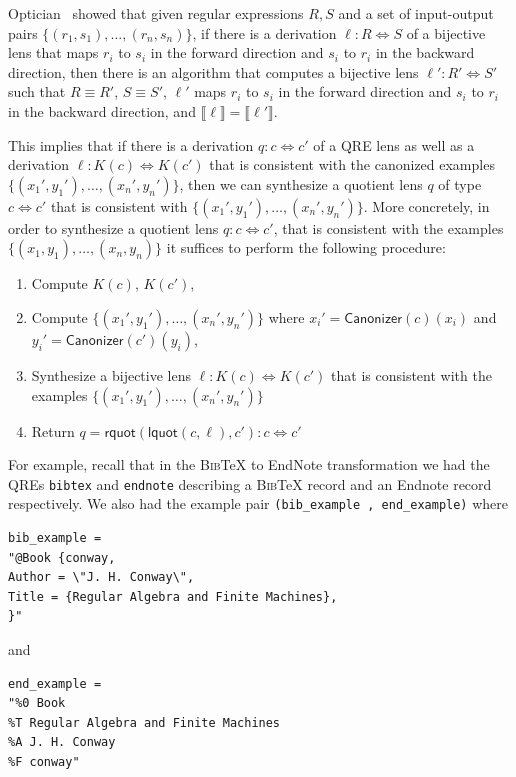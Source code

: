 \documentclass[acmsmall,review,anonymous]{acmart}\settopmatter{printfolios=true,printccs=false,printacmref=false}
\newcommand{\kw}[1]{\ensuremath{\mathsf{#1}}}
\newcommand{\canonizer}{\ensuremath{\kw{Canonizer}}}
\newcommand{\bibtex}{\textsc{Bib}\TeX{}}
\newcommand{\cd}[1]{\lstinline[backgroundcolor=\color{white}]$#1$}
\begin{document}
Optician~\cite{optician} showed that given regular expressions
$R, S$ and a set of input-output pairs $\{(r_1, s_1), \ldots, (r_n, s_n)\}$, if
there is a derivation $\ell : R \Leftrightarrow S$ of a bijective lens that
maps $r_i$ to $s_i$ in the forward direction and $s_i$ to $r_i$ in the backward
direction, then there is an algorithm that computes a bijective lens $\ell' :
R' \Leftrightarrow S'$ such that $R \equiv R'$, $S \equiv S'$, $\ell'$ maps
$r_i$ to $s_i$ in the forward direction and $s_i$ to $r_i$ in the backward
direction, and $\llbracket \ell \rrbracket = \llbracket \ell'
\rrbracket$.

This implies that if there is a derivation $q : c \Leftrightarrow
c'$ of a QRE lens as well as a derivation $\ell : K(c) \Leftrightarrow K(c')$
that is consistent with the canonized examples $\{({x_1}', {y_1}'),
\ldots, ({x_n}', {y_n}')\}$, then we can synthesize a quotient lens $q$ of
type $c \Leftrightarrow c'$ that is consistent with $\{({x_1}', {y_1}'),
\ldots, ({x_n}', {y_n}')\}$. More concretely, in order to synthesize a
quotient lens $q: c \Leftrightarrow c'$, that is consistent with the examples
$\{(x_1, y_1), \ldots, (x_n, y_n)\}$ it suffices to perform the following
procedure:
\begin{enumerate}
  \item
  Compute $K(c)$, $K(c')$,
  \item
  Compute $\{({x_1}', {y_1}'), \ldots, ({x_n}', {y_n}')\}$ where ${x_i}' =
  \canonizer(c)(x_i)$ and ${y_i}' = \canonizer(c')(y_i)$,
  \item
  Synthesize a bijective lens $\ell : K(c) \Leftrightarrow K(c')$ that is
  consistent with the examples $\{({x_1}', {y_1}'), \ldots, ({x_n}',
  {y_n}')\}$
  \item
  Return $q = \kw{rquot}(\kw{lquot}(c, \ell), c') : c \Leftrightarrow
  c'$
\end{enumerate}
For example, recall that in the \bibtex{} to EndNote transformation we had the
QREs \cd{bibtex} and \cd{endnote} describing a \bibtex{} record and an Endnote
record respectively. We also had the example pair \cd{(bib_example ,
end_example)} where

\begin{lstlisting}
bib_example =
"@Book {conway,
Author = \"J. H. Conway\",
Title = {Regular Algebra and Finite Machines},
}"
\end{lstlisting}

\noindent and

\begin{lstlisting}
end_example =
"%0 Book
%T Regular Algebra and Finite Machines
%A J. H. Conway
%F conway"
\end{lstlisting}
\end{document}
